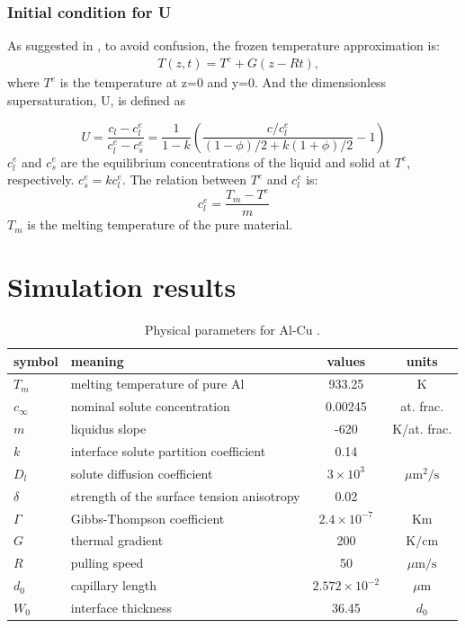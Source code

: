 \documentclass[final,times]{elsarticle}
\numberwithin{equation}{section}
\begin{document}
\subsubsection{Initial condition for U}
As suggested in \cite{Takaki2014}, to avoid confusion, the frozen temperature approximation is:
\begin{align}
    & T(z,t) = T^e + G(z-Rt),
\end{align}
where $T^e$ is the temperature at z=0 and y=0.
And the dimensionless supersaturation, U, is defined as

\begin{equation}
U=\frac{c_{l}-c_{l}^{e}}{c_{l}^{e}-c_{s}^{e}}=\frac{1}{1-k} \left( \frac{ c/c_l^e}{(1-\phi)/2 + k(1+\phi)/2} -1\right)
\end{equation}
$c_l^e$ and $c_s^e$ are the equilibrium concentrations of the liquid and solid at $T^e$, respectively. $c_s^e=kc_l^e$.
The relation between $T^e$ and $c_l^e$ is:
\begin{equation}
c_l^e = \frac{T_m-T^{e}}{m}
\end{equation}
$T_m$ is the melting temperature of the pure material.


\section{Simulation results}

\begin{table}
\centering
\caption{Physical parameters for Al-Cu \cite{Takaki2014}.}
\begin{tabular}{l l c c }
\toprule
symbol & meaning & values & units \\
\midrule
$T_m$ & melting temperature of pure Al & 933.25  & K \\
$c_{\infty}$ & nominal solute concentration &  0.00245 & at. frac. \\
$m$ &liquidus slope &  -620 & K/at. frac. \\
$k$ & interface solute partition coefficient & 0.14 &\\
$D_l$ & solute diffusion coefficient &  $3\times 10^{3}$  & ${\mu\text{m}}^2/\text{s}$ \\
$\delta$ & strength of the surface tension anisotropy  &  0.02  &\\
$\Gamma$ & Gibbs-Thompson coefficient & $2.4\times 10^{-7}$ & Km \\
$G$ & thermal gradient & 200 & $\text{K} / \text{cm}$ \\
$R$ & pulling speed &  50 & $\mu \text{m} / \text{s}$ \\
$d_0$ & capillary length & $ 2.572\times10^{-2}$  & $\mu$m \\
$W_0$ & interface thickness  & 36.45 & $d_0$ \\
\bottomrule
\end{tabular}\label{tab:Takaki}

\end{table}
\end{document}
